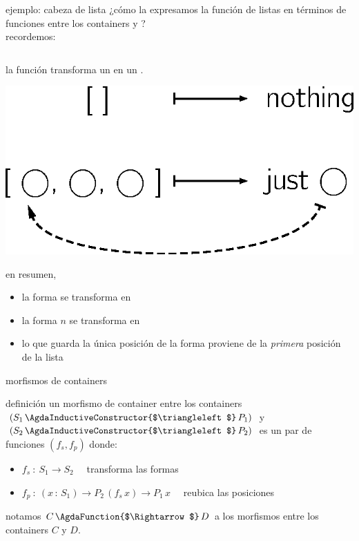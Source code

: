 \documentclass[9pt]{beamer}
\newcommand{\saltar}{\vspace{1ex}}
\begin{document}
\begin{frame}[fragile]{ejemplo: cabeza de lista}
  ¿cómo la expresamos la función  de listas en términos de funciones entre los containers  y ?\\
  \pause
  recordemos:
  \begin{columns}[T,onlytextwidth]
    \hspace{-1ex}
  \end{columns}
  \pause
  la función  transforma un  en un .\\\saltar
  \begin{center}\includegraphics[scale=0.4]{img/head.eps}\end{center}
  en resumen,
    \begin{itemize}
    \item la forma  se transforma en 
    \item la forma  $n$ se transforma en 
    \item lo que guarda la única posición de la forma  proviene de la \emph{primera} posición de la lista
    \end{itemize}
\end{frame}


\begin{frame}{morfismos de containers}
  \begin{block}{definición}
    un \alert{morfismo de container} entre los containers $(S_1\, \AgdaInductiveConstructor{$\triangleleft$}\, P_1)$ y $(S_2\, \AgdaInductiveConstructor{$\triangleleft$}\, P_2)$ es un par de funciones $(f_s, f_p)$ donde:
    \begin{itemize}
    \item $f_s\ :\ S_1 \to S_2\quad$ transforma las formas
    \item $f_p\ :\ (x\, :\, S_1) \to P_2\, (f_s\, x) \to P_1\, x\quad$ reubica las posiciones
    \end{itemize}\saltar
  \end{block}
  notamos $C\, \AgdaFunction{$\Rightarrow$}\, D$ a los morfismos entre los containers $C$ y $D$.
\end{frame}
\end{document}
